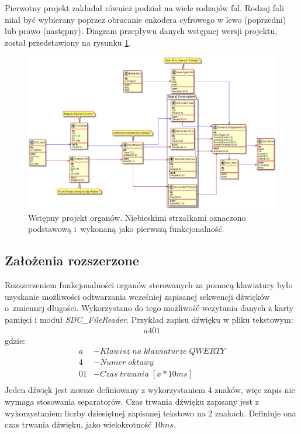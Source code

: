 \documentclass[a4paper,12pt]{article}
\begin{document}


Pierwotny projekt zakładał również podział na wiele rodzajów fal. Rodzaj fali miał być wybierany poprzez obracanie enkodera cyfrowego w lewo (poprzedni) lub prawo (następny). Diagram przepływu danych wstępnej wersji projektu, został przedstawiony na rysunku \ref{base}.

\begin{figure}[H]
  \centering
  \includegraphics[width=\linewidth]{./diagram/out/flow_chart}
  \caption{Wstępny projekt organów. Niebieskimi strzałkami oznaczono podstawową i~wykonaną jako pierwszą funkcjonalność. }
  \label{base}
\end{figure}



\subsection{Założenia rozszerzone}

Rozszerzeniem funkcjonalności organów sterowanych za pomocą klawiatury było uzyskanie możliwości odtwarzania wcześniej zapisanej sekwencji dźwięków o~zmiennej długości. Wykorzystano do tego możliwość wczytania danych z karty pamięci i moduł \textit{SDC\_FileReader}.
Przykład zapisu dźwięku w pliku tekstowym:
\begin{align*}
  a401
\end{align*}
gdzie:
\begin{align*}
  a                & - Klawisz\;na\;klawiaturze\;QWERTY \\
  4                & - Numer\;oktawy                   \\
  01 & - Czas\;trwania\;[x*10ms]           \\
\end{align*}
Jeden dźwięk jest zawsze definiowany z wykorzystaniem 4 znaków, więc zapis nie wymaga stosowania separatorów. Czas trwania dźwięku zapisany jest z wykorzystaniem liczby dziesiętnej zapisanej tekstowo na 2 znakach. Definiuje ona czas trwania dźwięku, jako wielokrotność $10ms$.
\end{document}
